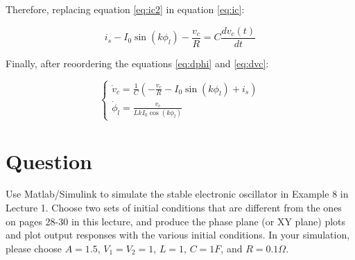 \documentclass[a4paper,10pt]{article}
\begin{document}
Therefore, replacing equation \ref{eq:ic2} in equation \ref{eq:ic}: 

\begin{equation}
i_s - I_0\sin(k\phi_l) - \frac{v_c}{R} = C\frac{dv_c(t)}{dt} \label{eq:dvc}
\end{equation}

Finally, after reoordering the equations \ref{eq:dphi} and \ref{eq:dvc}:

\begin{equation}
  \begin{cases}
    \dot{v}_c = \frac{1}{C} \left(- \frac{v_c}{R} - I_0\sin(k\phi_l)+ i_s\right)\\
    \dot{\phi}_l = \frac{v_c}{LkI_0\cos(k\phi_l)}
  \end{cases}
\end{equation}
\section{Question}
Use Matlab/Simulink to simulate the stable electronic oscillator in Example 8 in Lecture 1. Choose two sets of initial conditions that are different from the ones on pages 28-30 in this lecture, and produce the phase plane (or XY plane) plots and
plot output responses with the various initial conditions. 
In your simulation, please choose $A=1.5$, $V_1 =V_2 =1$, $L=1$, $C=1F$, and $R=0.1\Omega$.
\end{document}
